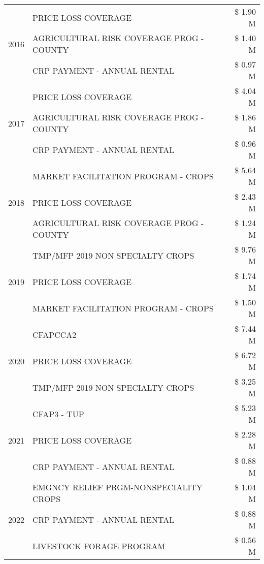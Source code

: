 \begin{tabular}{llr}
\cline{1-3}
\multirow[t]{3}{*}{2016} & PRICE LOSS COVERAGE & \$ 1.90 M \\
 & AGRICULTURAL RISK COVERAGE PROG - COUNTY & \$ 1.40 M \\
 & CRP PAYMENT - ANNUAL RENTAL & \$ 0.97 M \\
\cline{1-3}
\multirow[t]{3}{*}{2017} & PRICE LOSS COVERAGE & \$ 4.04 M \\
 & AGRICULTURAL RISK COVERAGE PROG - COUNTY & \$ 1.86 M \\
 & CRP PAYMENT - ANNUAL RENTAL & \$ 0.96 M \\
\cline{1-3}
\multirow[t]{3}{*}{2018} & MARKET FACILITATION PROGRAM - CROPS & \$ 5.64 M \\
 & PRICE LOSS COVERAGE & \$ 2.43 M \\
 & AGRICULTURAL RISK COVERAGE PROG - COUNTY & \$ 1.24 M \\
\cline{1-3}
\multirow[t]{3}{*}{2019} & TMP/MFP 2019 NON SPECIALTY CROPS & \$ 9.76 M \\
 & PRICE LOSS COVERAGE & \$ 1.74 M \\
 & MARKET FACILITATION PROGRAM - CROPS & \$ 1.50 M \\
\cline{1-3}
\multirow[t]{3}{*}{2020} & CFAPCCA2 & \$ 7.44 M \\
 & PRICE LOSS COVERAGE & \$ 6.72 M \\
 & TMP/MFP 2019 NON SPECIALTY CROPS & \$ 3.25 M \\
\cline{1-3}
\multirow[t]{3}{*}{2021} & CFAP3 - TUP & \$ 5.23 M \\
 & PRICE LOSS COVERAGE & \$ 2.28 M \\
 & CRP PAYMENT - ANNUAL RENTAL & \$ 0.88 M \\
\cline{1-3}
\multirow[t]{3}{*}{2022} & EMGNCY RELIEF PRGM-NONSPECIALITY CROPS & \$ 1.04 M \\
 & CRP PAYMENT - ANNUAL RENTAL & \$ 0.88 M \\
 & LIVESTOCK FORAGE PROGRAM & \$ 0.56 M \\
\cline{1-3}
\bottomrule
\end{tabular}
